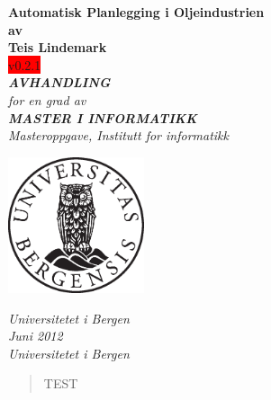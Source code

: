\documentclass[12pt,twoside,norsk,onecolumn]{article}
\begin{document}
\newcommand{\versjon}{v0.2.1}

\thispagestyle{empty}
\begin{center}        %
  \vspace{5mm}          %
  \LARGE
  \textbf{Automatisk Planlegging i Oljeindustrien} \\
  \Large
  \vspace{5mm}
  \textbf{av} \\
  \vspace{5mm}
  \large
  \textbf{Teis Lindemark} \\
  \colorbox{red}{\versjon} \\
  \vspace{30mm}
  \Large
  {\bf{\textsl{AVHANDLING}}} \\
  \textsl{for en grad av} \\
  \vspace{2mm}
  {\bf{\textsl{MASTER I INFORMATIKK}}} \\
  \vspace{5mm}
  {\large \textsl {Masteroppgave, Institutt for informatikk}}\\
  \vspace{10mm}
  \centerline{\includegraphics[width=4cm,height=4cm]{uibugle}}
  \vspace{5mm}
  \textsl{Universitetet i Bergen} \\
  \vspace{10mm}
  \large
  \textsl{Juni 2012} \\
  \vspace{5mm}
  \normalsize
  \textsl{Universitetet i Bergen} \\
\end{center}
\newpage
\vspace*{\fill}
\begin{abstract}
TEST
\end{abstract}
\vspace*{\fill}
\newpage
\end{document}

